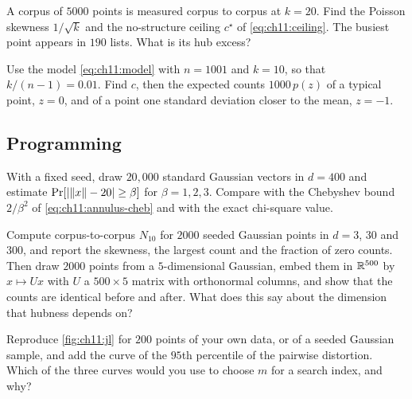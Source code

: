 \begin{exercise}\label{exr:ch11:ceil}
A corpus of $5000$ points is measured corpus to corpus at $k=20$. Find the Poisson skewness $1/\sqrt k$ and the no-structure ceiling $c^\star$ of \cref{eq:ch11:ceiling}. The busiest point appears in $190$ lists. What is its hub excess?
\end{exercise}

\begin{exercise}\label{exr:ch11:model}
Use the model \cref{eq:ch11:model} with $n=1001$ and $k=10$, so that $k/(n-1)=0.01$. Find $c$, then the expected counts $1000\,p(z)$ of a typical point, $z=0$, and of a point one standard deviation closer to the mean, $z=-1$.
\end{exercise}

\subsection*{Programming}

\begin{exercise}\label{exr:ch11:prog-norm}
With a fixed seed, draw $20{,}000$ standard Gaussian vectors in $d=400$ and estimate $\Pr[\lvert \lVert x\rVert-20\rvert\ge\beta]$ for $\beta=1,2,3$. Compare with the Chebyshev bound $2/\beta^2$ of \cref{eq:ch11:annulus-cheb} and with the exact chi-square value.
\end{exercise}

\begin{exercise}\label{exr:ch11:prog-hub}
Compute corpus-to-corpus $N_{10}$ for $2000$ seeded Gaussian points in $d=3$, $30$ and $300$, and report the skewness, the largest count and the fraction of zero counts. Then draw $2000$ points from a $5$-dimensional Gaussian, embed them in $\mathbb{R}^{500}$ by $x\mapsto Ux$ with $U$ a $500\times5$ matrix with orthonormal columns, and show that the counts are identical before and after. What does this say about the dimension that hubness depends on?
\end{exercise}

\begin{exercise}\label{exr:ch11:prog-jl}
Reproduce \cref{fig:ch11:jl} for $200$ points of your own data, or of a seeded Gaussian sample, and add the curve of the $95$th percentile of the pairwise distortion. Which of the three curves would you use to choose $m$ for a search index, and why?
\end{exercise}

\let\sectionmark\savedsectionmarkxi

